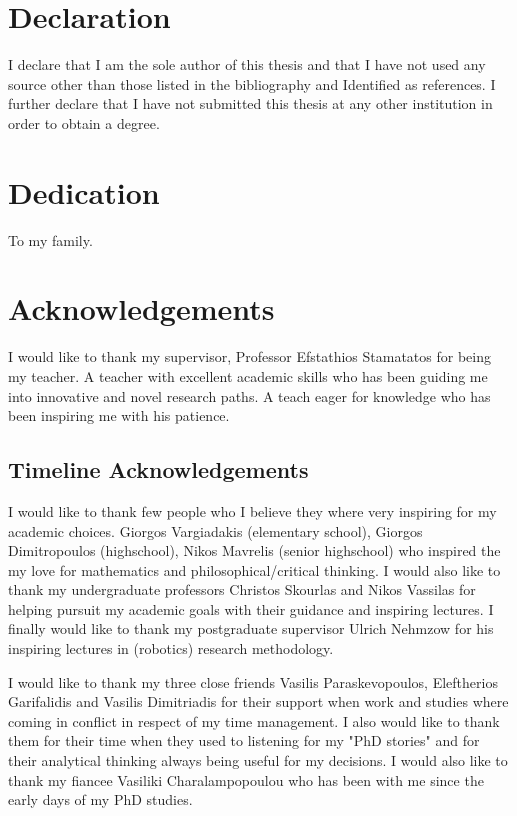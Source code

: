 \documentclass[
    12pt, %
    english, %
    singlespacing, %
    liststotoc, %
    headsepline, %
]{DoctoralThesis} %
\begin{document}
\section*{Declaration}
I declare that I am the sole author of this thesis and that I have not used any source other than those listed in the bibliography and Identified as references. I further declare that I have not submitted this thesis at any other institution in order to obtain a degree.

\newpage


\section*{Dedication}
To my family.

\newpage
 

\section*{Acknowledgements}
I would like to thank my supervisor, Professor Efstathios Stamatatos for being my teacher. A teacher with excellent academic skills who has been guiding me into innovative and novel research paths. A teach eager for knowledge who has been inspiring me with his patience.

\subsection*{Timeline Acknowledgements}
I would like to thank few people who I believe they where very inspiring for my academic choices. Giorgos Vargiadakis (elementary school), Giorgos Dimitropoulos (highschool), Nikos Mavrelis (senior highschool) who inspired the my love for mathematics and philosophical/critical thinking. I would also like to thank my undergraduate professors Christos Skourlas and Nikos Vassilas for helping pursuit my academic goals with their guidance and inspiring lectures. I finally would like to thank my postgraduate supervisor Ulrich Nehmzow for his inspiring lectures in (robotics) research methodology.

I would like to thank my three close friends Vasilis Paraskevopoulos, Eleftherios Garifalidis and Vasilis Dimitriadis for their support when work and studies where coming in conflict in respect of my time management. I also would like to thank them for their time when they used to listening for my "PhD stories" and for their analytical thinking always being useful for my decisions. I would also like to thank my fiancee Vasiliki Charalampopoulou who has been with me since the early days of my PhD studies.
\end{document}
